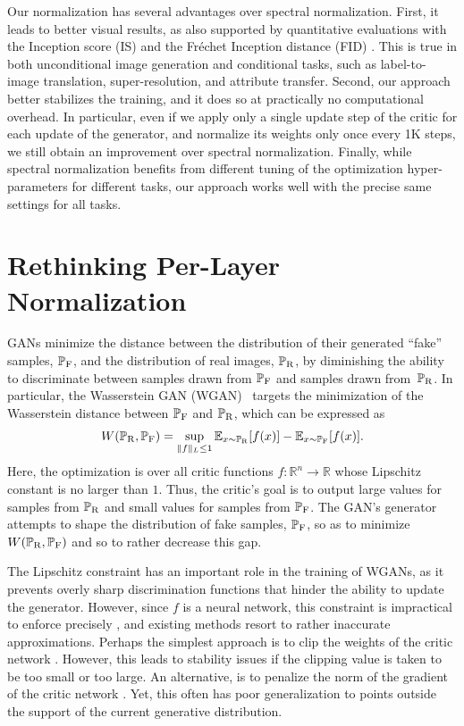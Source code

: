 \documentclass[letterpaper]{article} %
\begin{document}
Our normalization has several advantages over spectral normalization. First, it leads to better visual results, as also supported by quantitative evaluations with the Inception score (IS) \cite{inception} and the Fr\'echet Inception distance (FID) \cite{fid}. This is true in both unconditional image generation and conditional tasks, such as label-to-image translation, super-resolution, and attribute transfer. Second, our approach better stabilizes the training, and it does so at practically no computational overhead. In particular, even if we apply only a single update step of the critic for each update of the generator, and normalize its weights  only once every 1K steps, we still obtain an improvement over spectral normalization. Finally, while spectral normalization benefits from different tuning of the optimization hyper-parameters for different tasks, our approach works well with the precise same settings for all tasks.


\section{Rethinking Per-Layer Normalization}
GANs \cite{goodfellow2014generative} minimize the distance between the distribution of their generated ``fake'' samples, $\mathbb{P}_{\rm F}$, and the distribution of real images, $\mathbb{P}_{\rm R}$, by diminishing the ability to discriminate between samples drawn from $\mathbb{P}_{\rm F}$ and samples drawn from~$\mathbb{P}_{\rm R}$. In particular, the Wasserstein GAN (WGAN)~\cite{arjovsky2017wasserstein} targets the minimization of the Wasserstein distance between $\mathbb{P}_{\rm F}$ and $\mathbb{P}_{\rm R}$, which can be expressed as
\begin{equation}
W(\mathbb{P}_{\rm R},\mathbb{P}_{\rm F})=\sup_{\|f\|_L\leq 1} \mathbb{E}_{x\sim \mathbb{P}_{\rm R}}[f(x)] - \mathbb{E}_{x\sim \mathbb{P}_{\rm F}}[f(x)].
\end{equation}
Here, the optimization is over all critic functions $f:\mathbb{R}^n\rightarrow\mathbb{R}$ whose Lipschitz constant is no larger than $1$. Thus, the critic's goal is to output large values for samples from $\mathbb{P}_{\rm R}$ and small values for samples from $\mathbb{P}_{\rm F}$. The GAN's generator attempts to shape the distribution of fake samples, $\mathbb{P}_{\rm F}$, so as to minimize $W(\mathbb{P}_{\rm R},\mathbb{P}_{\rm F})$ and so to rather decrease this gap.

The Lipschitz constraint has an important role in the training of WGANs, as it prevents overly sharp discrimination functions that hinder the ability to update the generator. However, since $f$ is a neural network, this constraint is impractical to enforce precisely \cite{NIPS2018_7640}, and existing methods resort to rather inaccurate approximations. Perhaps the simplest approach is to clip the weights of the critic network \cite{arjovsky2017wasserstein}. However, this leads to stability issues if the clipping value is taken to be too small or too large. An alternative, is to penalize the norm of the gradient of the critic network \cite{gulrajani2017improved}. Yet, this often has poor generalization to points outside the support of the current generative distribution.
\end{document}
